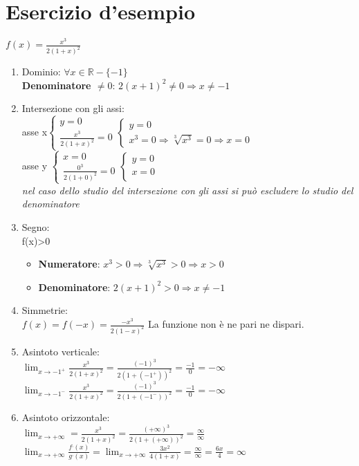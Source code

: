 \documentclass{book}
\begin{document}
\section{Esercizio d'esempio}
$f(x)=\frac{x^3}{2(1+x)^2}$
\begin{enumerate}
	\item Dominio: $\forall x \in \mathds{R} -\{-1\}$\\
		\textbf{Denominatore $\neq 0$}: $2(x+1)^2\neq0\Rightarrow x\neq -1$
	\item Intersezione con gli assi:\\
		asse x$\begin{cases}
			y=0\\
			\frac{x^3}{2(1+x)^2}=0
		\end{cases}
		\begin{cases}
			y=0\\
			x^3=0 \Rightarrow \sqrt[3]{x^3}=0\Rightarrow x=0
		\end{cases}$\\
		asse y $\begin{cases}
			x=0\\
			\frac{0^3}{2(1+0)^2}=0
		\end{cases}
		\begin{cases}
			y=0\\
			x=0\\
		\end{cases}$\\
		\textit{nel caso dello studio del intersezione con gli assi si può escludere lo studio del denominatore}
	\item Segno:\\
		f(x)>0
		\begin{itemize}
			\item \textbf{Numeratore}: $x^3>0 \Rightarrow \sqrt[3]{x^3}>0\Rightarrow x>0$
			\item \textbf{Denominatore}: $2(x+1)^2>0\Rightarrow x\neq -1$
		\end{itemize}
	\item Simmetrie: \\
		$f(x)=f(-x)=\frac{-x^3}{2(1-x)^2}$ La funzione non è ne pari ne dispari.
	\item Asintoto verticale:\\
		$\lim_{x\to-1^+}\frac{x^3}{2(1+x)^2}=\frac{(-1)^3}{2(1+(-1^+))^2}=\frac{-1}{0}=-\infty$\\
		$\lim_{x\to-1^-}\frac{x^3}{2(1+x)^2}=\frac{(-1)^3}{2(1+(-1^-))^2}=\frac{-1}{0}=-\infty$
	\item Asintoto orizzontale:\\
		$\lim_{x\to+\infty}=\frac{x^3}{2(1+x)^2}=\frac{(+\infty)^3}{2(1+(+\infty))^2}=\frac{\infty}{\infty}$\\
		$\lim_{x\to+\infty}\frac{f^,(x)}{g^,(x)}=\lim_{x\to+\infty}\frac{3x^2}{4(1+x)}=\frac{\infty}{\infty}=\frac{6x}{4}=\infty$
		
\end{enumerate}
\printindex
\end{document}

